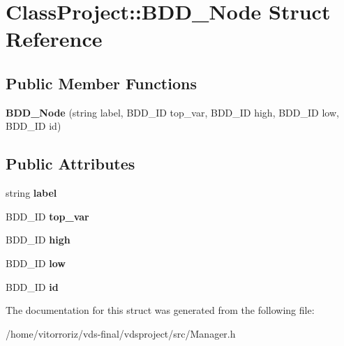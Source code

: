 \section{Class\+Project\+:\+:B\+D\+D\+\_\+\+Node Struct Reference}
\label{structClassProject_1_1BDD__Node}
\subsection*{Public Member Functions}
\begin{DoxyCompactItemize}
\item 
{\bfseries B\+D\+D\+\_\+\+Node} (string label, B\+D\+D\+\_\+\+ID top\+\_\+var, B\+D\+D\+\_\+\+ID high, B\+D\+D\+\_\+\+ID low, B\+D\+D\+\_\+\+ID id)\label{structClassProject_1_1BDD__Node_ad5ba4e97354b3329d8b251d96fd81416}

\end{DoxyCompactItemize}
\subsection*{Public Attributes}
\begin{DoxyCompactItemize}
\item 
string {\bfseries label}\label{structClassProject_1_1BDD__Node_a68ea5933421fa8f76202a7044d13cffb}

\item 
B\+D\+D\+\_\+\+ID {\bfseries top\+\_\+var}\label{structClassProject_1_1BDD__Node_a334b891f34eac8419a6402c6e7c730dd}

\item 
B\+D\+D\+\_\+\+ID {\bfseries high}\label{structClassProject_1_1BDD__Node_a1b094c78ca5aabfbf8b2ca3908ebc0d8}

\item 
B\+D\+D\+\_\+\+ID {\bfseries low}\label{structClassProject_1_1BDD__Node_a263243c7dc98c163f1b6f076cc948a2c}

\item 
B\+D\+D\+\_\+\+ID {\bfseries id}\label{structClassProject_1_1BDD__Node_a3b0b7736bfb22fd65bf790cb308450a5}

\end{DoxyCompactItemize}


The documentation for this struct was generated from the following file\+:\begin{DoxyCompactItemize}
\item 
/home/vitorroriz/vds-\/final/vdsproject/src/Manager.\+h\end{DoxyCompactItemize}
